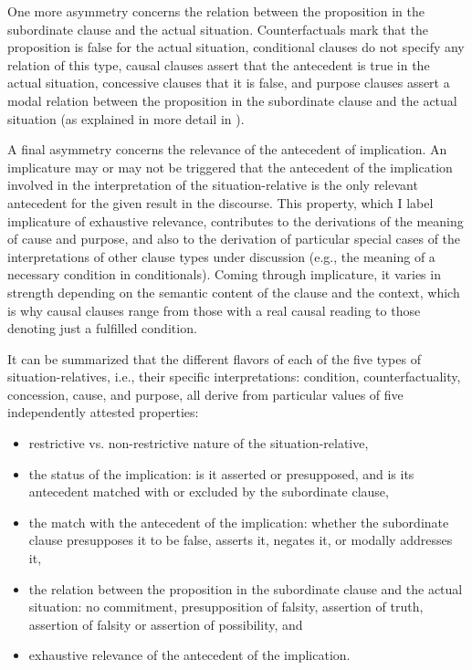 \documentclass[output=paper]{langscibook}
\begin{document}
One more asymmetry concerns the relation between the proposition in the subordinate clause and the actual situation. Counterfactuals mark that the proposition is false for the actual situation, conditional clauses do not specify any relation of this type, causal clauses assert that the antecedent is true in the actual situation, concessive clauses that it is false, and purpose clauses assert a modal relation between the proposition in the subordinate clause and the actual situation (as explained in more detail in ).

A final asymmetry concerns the relevance of the antecedent of implication. An implicature may or may not be triggered that the antecedent of the implication involved in the interpretation of the situation-relative is the only relevant antecedent for the given result in the discourse.  This property, which I label implicature of exhaustive relevance, contributes to the derivations of the meaning of cause and purpose, and also to the derivation of particular special cases of the interpretations of other clause types under discussion (e.g., the meaning of a necessary condition in conditionals). Coming through implicature, it varies in strength depending on the semantic content of the clause and the context, which is why causal clauses range from those with a real causal reading to those denoting just a fulfilled condition.

It can be summarized that the different flavors of each of the five types of situation-relatives, i.e., their specific interpretations: condition, counterfactuality, concession, cause, and purpose, all derive from particular values of five independently attested properties:

\begin{itemize}
\item restrictive vs. non-restrictive nature of the situation-relative,
\item the status of the implication: is it asserted or presupposed, and is its antecedent matched with or excluded by the subordinate clause,
\item the match with the antecedent of the implication: whether the subordinate clause presupposes it to be false, asserts it, negates it, or modally addresses it,
\item the relation between the proposition in the subordinate clause and the actual situation: no commitment, presupposition of falsity, assertion of truth, assertion of falsity or assertion of possibility, and
\item exhaustive relevance of the antecedent of the implication.
\end{itemize}
\end{document}
